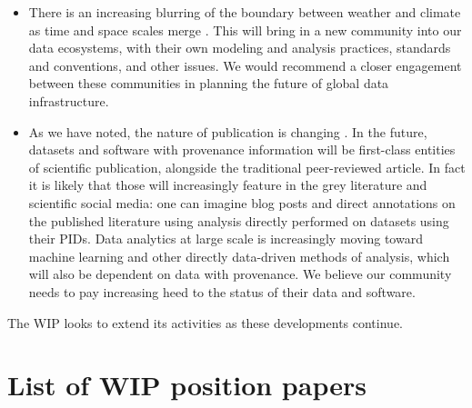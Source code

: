 \documentclass[gmd,manuscript]{copernicus}
\newcommand{\pipref}[1] {\citep{ref:#1}}
\begin{document}
\begin{itemize}
\item There is an increasing blurring of the boundary between weather
  and climate as time and space scales merge \pipref{hoskins2013}.
  This will bring in a new community into our data ecosystems, with
  their own modeling and analysis practices, standards and
  conventions, and other issues. We would recommend a closer
  engagement between these communities in planning the future of
  global data infrastructure.
\item As we have noted, the nature of publication is changing
  \citep[see e.g][]{ref:davidetal2016}. In the future, datasets and
  software with provenance information will be first-class entities of
  scientific publication, alongside the traditional peer-reviewed
  article. In fact it is likely that those will increasingly feature
  in the grey literature and scientific social media: one can imagine
  blog posts and direct annotations on the published literature using
  analysis directly performed on datasets using their PIDs. Data
  analytics at large scale is increasingly moving toward machine
  learning and other directly data-driven methods of analysis, which
  will also be dependent on data with provenance. We believe our
  community needs to pay increasing heed to the status of their data
  and software.
\end{itemize}

The WIP looks to extend its activities as these developments continue.

\appendix

\section{List of WIP position papers}
\label{sec:wip}
\end{document}
